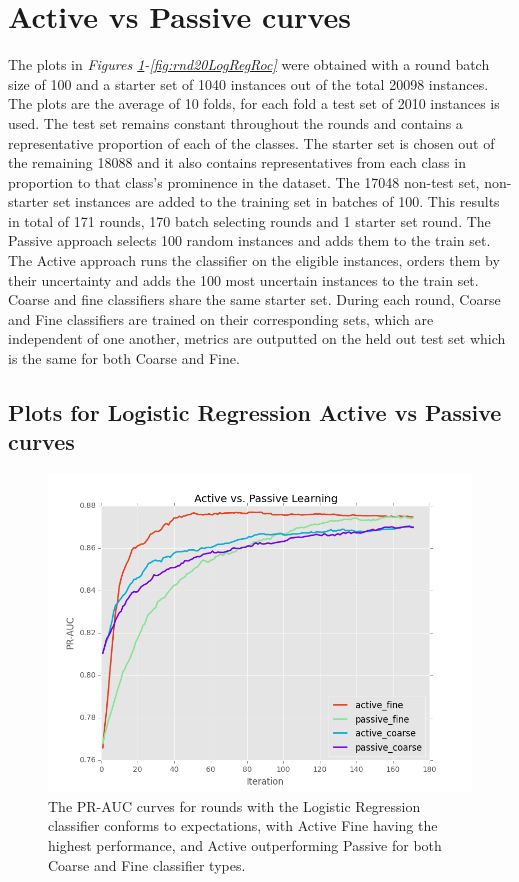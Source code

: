 \documentclass[ms]{nuthesis}
\begin{document}
\section{Active vs Passive curves}
\par The plots in \textit{Figures \ref{fig:runActPassLogReg_pr}-\ref{fig:rnd20LogRegRoc}}
were obtained with a round batch size of 100
and a starter set of 1040 instances out of the total 20098 instances.
The plots are the average of 10 folds, for each fold a test set of 2010 instances
is used. The test set remains constant throughout the rounds and contains a representative proportion
 of each of the classes. The starter set is chosen out of the remaining 18088 and it also contains representatives
 from each class in proportion to that class's prominence in the dataset. The 17048 non-test set, non-starter set
  instances are added to the training set in batches of 100. This results in total of 171 rounds, 170 batch selecting
  rounds and 1 starter set round. The Passive approach selects 100 random instances
   and adds them to the train set. The Active approach runs the classifier on the eligible instances, orders them
   by their uncertainty and adds the 100 most uncertain instances to the train set. Coarse and fine classifiers
   share the same starter set. During each round, Coarse and Fine classifiers are trained on their corresponding
 sets, which are independent of one another, metrics are outputted on the held out test set which is the same for
 both Coarse and Fine.


\FloatBarrier
\subsection{Plots for Logistic Regression Active vs Passive curves}
\begin{figure}[!htb]
	\centering
    \includegraphics[width=1.0\columnwidth]{fig/runActPassLogReg_pr}
    \caption{The PR-AUC curves for rounds with the Logistic
Regression classifier conforms to expectations, with Active Fine having
the highest performance, and Active outperforming Passive for both Coarse
and Fine classifier types.}
\label{fig:runActPassLogReg_pr}
\end{figure}
\FloatBarrier
\end{document}
